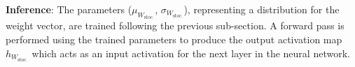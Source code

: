 \documentclass[12pt, letterpaper]{article}
\begin{document}
\textbf{Inference}:
The parameters ($\mu_{W_\mathrm{stoc.}}$, $\sigma_{W_\mathrm{stoc.}}$), representing a distribution for the weight vector, are trained following the previous sub-section.
A forward pass is performed using the trained parameters to produce the output activation map $h_{W_\mathrm{stoc.}}$ which acts as an input activation for the next layer in the neural network.
\end{document}
